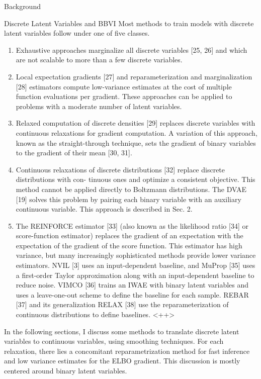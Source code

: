 \documentclass{article}
\begin{document}
\begin{psection}{Background}
\begin{psubsection}{Discrete Latent Variables and BBVI}
		Most methods to train models with discrete latent variables follow under one of five classes.
		\begin{enumerate}
			\item <++> Exhaustive approaches marginalize all discrete variables [25, 26] and which are not scalable to more than a few discrete variables.
			\item Local expectation gradients [27] and reparameterization and marginalization [28] estimators compute low-variance estimates at the cost of multiple function evaluations per gradient. These approaches can be applied to problems with a moderate number of latent variables.
			\item Relaxed computation of discrete densities [29] replaces discrete variables with continuous relaxations for gradient computation. A variation of this approach, known as the straight-through technique, sets the gradient of binary variables to the gradient of their mean [30, 31].
			\item Continuous relaxations of discrete distributions [32] replace discrete distributions with con- tinuous ones and optimize a consistent objective. This method cannot be applied directly to Boltzmann distributions. The DVAE [19] solves this problem by pairing each binary variable with an auxiliary continuous variable. This approach is described in Sec. 2.
			\item The REINFORCE estimator [33] (also known as the likelihood ratio [34] or score-function estimator) replaces the gradient of an expectation with the expectation of the gradient of the score function. This estimator has high variance, but many increasingly sophisticated methods provide lower variance estimators. NVIL [3] uses an input-dependent baseline, and MuProp [35] uses a first-order Taylor approximation along with an input-dependent baseline to reduce noise.  VIMCO [36] trains an IWAE with binary latent variables and uses a leave-one-out scheme to define the baseline for each sample. REBAR [37] and its generalization RELAX [38] use the reparameterization of continuous distributions to define baselines.
			<++>
		\end{enumerate}

		In the following sections, I discuss some methods to translate discrete latent variables to continuous variables, using smoothing techniques. For each relaxation, there lies a concomitant reparametrization method for fast inference and low variance estimates for the ELBO gradient. This discussion is mostly centered around binary latent variables.


\end{psubsection}
\end{psection}
\end{document}

